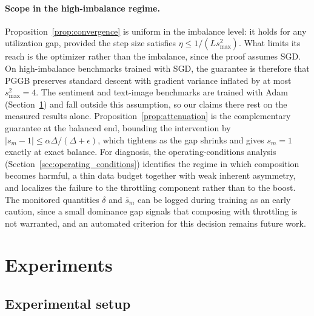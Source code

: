 \documentclass{article}
\begin{document}
\paragraph{Scope in the high-imbalance regime.}
Proposition~\ref{prop:convergence} is uniform in the imbalance level: it holds for any utilization gap, provided the step size satisfies $\eta \le 1/(L s_{\max}^2)$. What limits its reach is the optimizer rather than the imbalance, since the proof assumes SGD. On high-imbalance benchmarks trained with SGD, the guarantee is therefore that PGGB preserves standard descent with gradient variance inflated by at most $s_{\max}^2 = 4$. The sentiment and text-image benchmarks are trained with Adam (Section~\ref{sec:experiments}) and fall outside this assumption, so our claims there rest on the measured results alone. Proposition~\ref{prop:attenuation} is the complementary guarantee at the balanced end, bounding the intervention by $|s_m - 1| \le \alpha \Delta / (\Delta + \epsilon)$, which tightens as the gap shrinks and gives $s_m = 1$ exactly at exact balance. For diagnosis, the operating-conditions analysis (Section~\ref{sec:operating_conditions}) identifies the regime in which composition becomes harmful, a thin data budget together with weak inherent asymmetry, and localizes the failure to the throttling component rather than to the boost. The monitored quantities $\delta$ and $\bar{s}_m$ can be logged during training as an early caution, since a small dominance gap signals that composing with throttling is not warranted, and an automated criterion for this decision remains future work.

\section{Experiments}
\label{sec:experiments}
\vspace{-1.2em}

\subsection{Experimental setup}
\label{sec:datasets}
\end{document}
